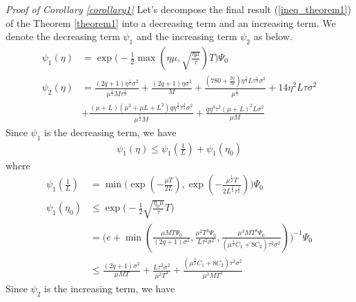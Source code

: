 \documentclass[11pt]{article}
\begin{document}
\emph{Proof of Corollary \ref{corollary1}} \textrm{ } Let's decompose the final result (\ref{ineq_theorem1}) of the Theorem \ref{theorem1} into a decreasing term and an increasing term. We denote the decreasing term $\psi_1$ and the increasing term $\psi_2$ as below.
\begin{align*}
    \psi_1(\eta) &= \exp\Big( -\frac{1}{2}\max(\eta\mu, \sqrt{\frac{\eta\mu}{\tau}})T \Big)\Psi_0 \\
    \psi_2(\eta) &= \frac{(2q+1)\eta^{\frac{1}{2}}\sigma^2}{\mu^{\frac{1}{2}}M\tau^{\frac{1}{2}}} + \frac{(2q+1)\eta\sigma^2}{M} + \frac{(780+\frac{2q}{M})\eta^{\frac{3}{2}}L\tau^{\frac{1}{2}}\sigma^2}{\mu^{\frac{1}{2}}} + 14\eta^2 L\tau\sigma^2 \\
    &+ \frac{(\mu+L)(\mu^2+\mu L+L^2)q\eta^{\frac{3}{2}}\tau^{\frac{1}{2}}\sigma^2}{\mu^{\frac{5}{2}}M} + \frac{q\eta^3\tau^2(\mu+L)^2 L\sigma^2}{\mu M}
\end{align*}
Since $\psi_1$ is the decreasing term, we have
\begin{align} \label{ineq_corollary1-1}
    \psi_1(\eta) \leq \psi_1(\frac{1}{L}) + \psi_1(\eta_0)
\end{align}
where
\begin{align*}
    \psi_1(\frac{1}{L}) &= \min \Big( \exp(-\frac{\mu T}{2L}), \exp(-\frac{\mu^{\frac{1}{2}}T}{2 L^{\frac{1}{2}}\tau^{\frac{1}{2}}})\Big) \Psi_0 \\
    \psi_1(\eta_0) &\leq \exp \Big( -\frac{1}{2} \sqrt{\frac{\eta_0 \mu}{\tau}}T\Big) \\
    &= \Big(e+\min(\frac{\mu M T \Psi_0}{(2q+1)\sigma^2}, \frac{\mu^2 T^3\Psi_0}{L\tau^2\sigma^2}, \frac{\mu^3 M T^3\Psi_0}{(\mu^{\frac{3}{2}}C_1+8C_2)\tau^2\sigma^2}) \Big)^{-1} \Psi_0 \\
    &\leq \frac{(2q+1)\sigma^2}{\mu MT} + \frac{L\tau^2\sigma^2}{\mu^2 T^3} + \frac{(\mu^{\frac{3}{2}}C_1+8C_2)\tau^2\sigma^2}{\mu^3 M T^3}
\end{align*}
Since $\psi_2$ is the increasing term, we have
\end{document}

